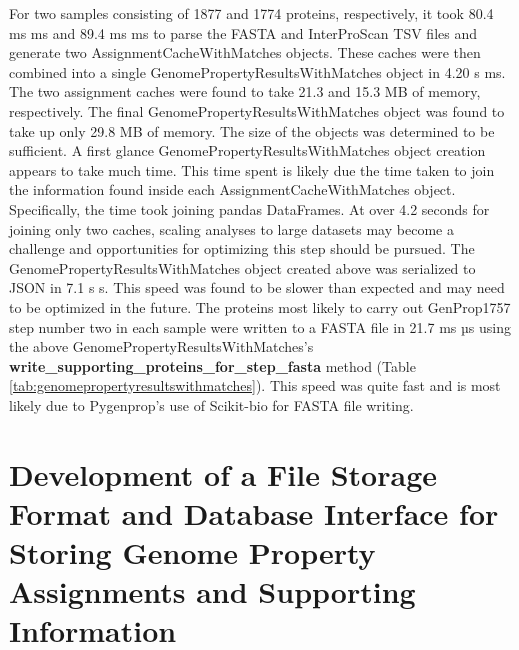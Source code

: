 For two samples consisting of 1877 and 1774 proteins, respectively, it took 80.4 ms  ms and 89.4 ms  ms to parse the FASTA and InterProScan TSV files and generate two AssignmentCacheWithMatches objects. These caches were then combined into a single GenomePropertyResultsWithMatches object in 4.20 s  ms. The two assignment caches were found to take 21.3 and 15.3 MB of memory, respectively. The final GenomePropertyResultsWithMatches object was found to take up only 29.8 MB of memory. The size of the objects was determined to be sufficient. A first glance GenomePropertyResultsWithMatches object creation appears to take much time. This time spent is likely due the time taken to join the information found inside each AssignmentCacheWithMatches object. Specifically, the time took joining pandas DataFrames. At over 4.2 seconds for joining only two caches, scaling analyses to large datasets may become a challenge and opportunities for optimizing this step should be pursued. The GenomePropertyResultsWithMatches object created above was serialized to JSON in 7.1 s  s. This speed was found to be slower than expected and may need to be optimized in the future. The proteins most likely to carry out GenProp1757 step number two in each sample were written to a FASTA file in 21.7 ms  µs using the above GenomePropertyResultsWithMatches's \textbf{write\_supporting\_proteins\_for\_step\_fasta} method (Table \ref{tab:genomepropertyresultswithmatches}). This speed was quite fast and is most likely due to Pygenprop's use of Scikit-bio for FASTA file writing.

\section{Development of a File Storage Format and Database Interface for Storing Genome Property Assignments and Supporting Information} \label{MicromedaFiles}

